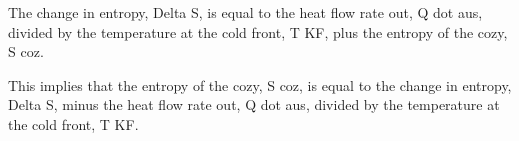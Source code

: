 The change in entropy, Delta S, is equal to the heat flow rate out, Q dot aus, divided by the temperature at the cold front, T KF, plus the entropy of the cozy, S coz.

This implies that the entropy of the cozy, S coz, is equal to the change in entropy, Delta S, minus the heat flow rate out, Q dot aus, divided by the temperature at the cold front, T KF.